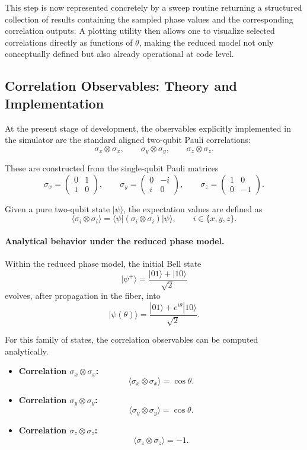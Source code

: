 \documentclass[a4paper]{article}
\begin{document}
This step is now represented concretely by a sweep routine returning a structured collection of results containing the sampled phase values and the corresponding correlation outputs. A plotting utility then allows one to visualize selected correlations directly as functions of \(\theta\), making the reduced model not only conceptually defined but also already operational at code level.

\subsection{Correlation Observables: Theory and Implementation}

At the present stage of development, the observables explicitly implemented in the simulator are the standard aligned two-qubit Pauli correlations:
\[
\sigma_x \otimes \sigma_x,\qquad
\sigma_y \otimes \sigma_y,\qquad
\sigma_z \otimes \sigma_z.
\]

These are constructed from the single-qubit Pauli matrices
\[
\sigma_x=
\begin{pmatrix}
0 & 1\\
1 & 0
\end{pmatrix},
\qquad
\sigma_y=
\begin{pmatrix}
0 & -i\\
i & 0
\end{pmatrix},
\qquad
\sigma_z=
\begin{pmatrix}
1 & 0\\
0 & -1
\end{pmatrix}.
\]

Given a pure two-qubit state \( |\psi\rangle \), the expectation values are defined as
\[
\langle \sigma_i \otimes \sigma_i \rangle
=
\langle \psi|
(\sigma_i \otimes \sigma_i)
|\psi\rangle,
\qquad i\in\{x,y,z\}.
\]

\paragraph{Analytical behavior under the reduced phase model.}

Within the reduced phase model, the initial Bell state
\[
|\psi^+\rangle = \frac{|01\rangle + |10\rangle}{\sqrt{2}}
\]
evolves, after propagation in the fiber, into
\[
|\psi(\theta)\rangle
=
\frac{|01\rangle + e^{i\theta}|10\rangle}{\sqrt{2}}.
\]

For this family of states, the correlation observables can be computed analytically.

\begin{itemize}
    \item \textbf{Correlation \( \sigma_x \otimes \sigma_x \):}
    \[
    \langle \sigma_x \otimes \sigma_x \rangle
    =
    \cos\theta.
    \]

    \item \textbf{Correlation \( \sigma_y \otimes \sigma_y \):}
    \[
    \langle \sigma_y \otimes \sigma_y \rangle
    =
    \cos\theta.
    \]

    \item \textbf{Correlation \( \sigma_z \otimes \sigma_z \):}
    \[
    \langle \sigma_z \otimes \sigma_z \rangle
    =
    -1.
    \]
\end{itemize}
\end{document}
